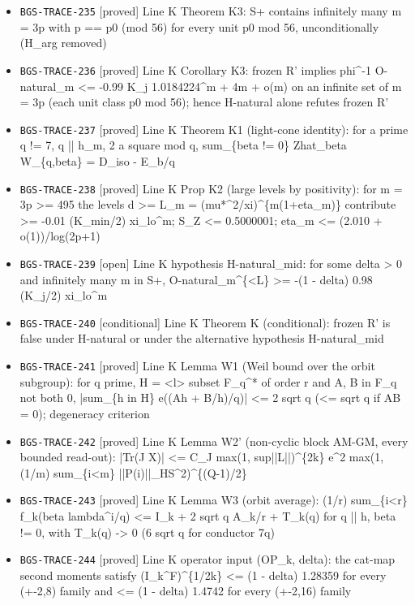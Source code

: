 \begin{itemize}
  \item \texttt{BGS-TRACE-235} [proved] Line K Theorem K3: S+ contains infinitely many m = 3p with p == p0 (mod 56) for every unit p0 mod 56, unconditionally (H\_arg removed)
  \item \texttt{BGS-TRACE-236} [proved] Line K Corollary K3: frozen R' implies phi\textasciicircum{}-1 O-natural\_m <= -0.99 K\_j 1.0184224\textasciicircum{}m + 4m + o(m) on an infinite set of m = 3p (each unit class p0 mod 56); hence H-natural alone refutes frozen R'
  \item \texttt{BGS-TRACE-237} [proved] Line K Theorem K1 (light-cone identity): for a prime q != 7, q || h\_m, 2 a square mod q, sum\_\{beta != 0\} Zhat\_beta W\_\{q,beta\} = D\_iso - E\_b/q
  \item \texttt{BGS-TRACE-238} [proved] Line K Prop K2 (large levels by positivity): for m = 3p >= 495 the levels d >= L\_m = (mu*\textasciicircum{}2/xi)\textasciicircum{}\{m(1+eta\_m)\} contribute >= -0.01 (K\_min/2) xi\_lo\textasciicircum{}m; S\_Z <= 0.5000001; eta\_m <= (2.010 + o(1))/log(2p+1)
  \item \texttt{BGS-TRACE-239} [open] Line K hypothesis H-natural\_mid: for some delta > 0 and infinitely many m in S+, O-natural\_m\textasciicircum{}\{<L\} >= -(1 - delta) 0.98 (K\_j/2) xi\_lo\textasciicircum{}m
  \item \texttt{BGS-TRACE-240} [conditional] Line K Theorem K (conditional): frozen R' is false under H-natural or under the alternative hypothesis H-natural\_mid
  \item \texttt{BGS-TRACE-241} [proved] Line K Lemma W1 (Weil bound over the orbit subgroup): for q prime, H = <l> subset F\_q\textasciicircum{}* of order r and A, B in F\_q not both 0, |sum\_\{h in H\} e((Ah + B/h)/q)| <= 2 sqrt q (<= sqrt q if AB = 0); degeneracy criterion
  \item \texttt{BGS-TRACE-242} [proved] Line K Lemma W2' (non-cyclic block AM-GM, every bounded read-out): |Tr(J X)| <= C\_J max(1, sup||L||)\textasciicircum{}\{2k\} e\textasciicircum{}2 max(1, (1/m) sum\_\{i<m\} ||P(i)||\_HS\textasciicircum{}2)\textasciicircum{}\{(Q-1)/2\}
  \item \texttt{BGS-TRACE-243} [proved] Line K Lemma W3 (orbit average): (1/r) sum\_\{i<r\} f\_k(beta lambda\textasciicircum{}i/q) <= I\_k + 2 sqrt q A\_k/r + T\_k(q) for q || h, beta != 0, with T\_k(q) -> 0 (6 sqrt q for conductor 7q)
  \item \texttt{BGS-TRACE-244} [proved] Line K operator input (OP\_k, delta): the cat-map second moments satisfy (I\_k\textasciicircum{}F)\textasciicircum{}\{1/2k\} <= (1 - delta) 1.28359 for every (+-2,8) family and <= (1 - delta) 1.4742 for every (+-2,16) family

\end{itemize}
